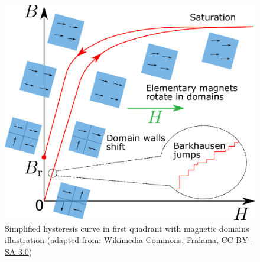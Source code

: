 \begin{frame}
\begin{columns}
\begin{column}{0.425\textwidth}
\begin{figure}
				\includegraphics[height=0.5\textheight]{fig/lec02/Ferromagnet_magnetization_and_magnetic_domains_and_hysteresis.pdf}
				\caption{Simplified hysteresis curve in first quadrant with magnetic domains illustration (adapted from: \href{https://commons.wikimedia.org/wiki/File:Ferromagnet_magnetization_and_magnetic_domains_and_hysteresis.svg}{Wikimedia Commons}, Fralama, \href{https://creativecommons.org/licenses/by-sa/3.0/deed.enn}{CC BY-SA 3.0})}
			\end{figure}
		\end{column}
		\end{columns}
\end{frame}

